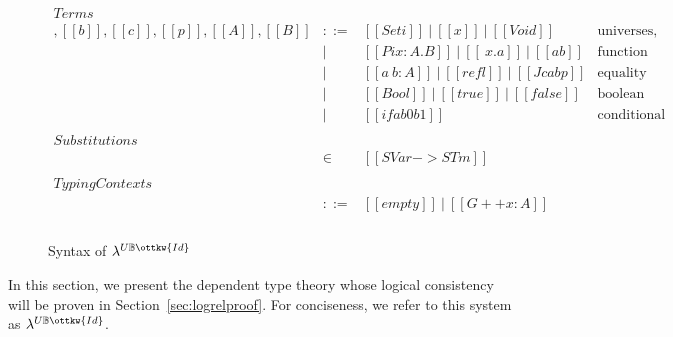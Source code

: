 \documentclass[acmsmall,screen=true,
\ifpublic review=false\else,review=true\fi
  ,anonymous=\ifanonymous true\else false\fi]{acmart}
\newcommand{\lang}{$\lambda^{U\mathbb{B}\ottkw{Id}}$\xspace}
\begin{document}
\begin{figure}[h]
\[
\begin{array}{lcll}
\mathit{Terms}\\
[[a]],[[b]],[[c]],[[p]],[[A]],[[B]] & ::= & [[Set i]]\ |\ [[x]]\  |\ [[Void]]
                  & \mbox{universes, variables, empty type} \\
            & |   & [[Pi x : A . B]]\ |\ [[\ x . a]]\ |\ [[a b]]
                  & \mbox{function types, abstractions, applications} \\
            & |   & [[a ~ b : A ]]\ |\  [[refl]]\ |\ [[J c a b p]]
                  & \mbox{equality types, reflexivity proof, J eliminator} \\
            & |   & [[Bool]]\ |\  [[true]]\ |\  [[false]]\ %
                  & \mbox{boolean type, true, false} \\
            & |   & [[if a b0 b1]]
                  & \mbox{conditional expression} \\ \\
\mathit{Substitutions}\\
[[rho]] & \in & [[SVar -> STm]] & \\ \\
\mathit{Typing Contexts}\\
 [[G]]       & ::= & [[empty]]\ |\ [[G ++ x : A]] &  \\ \\
\end{array}
\]
  \caption{Syntax of \lang}
  \label{fig:syntax}
\end{figure}


In this section, we present the dependent type theory whose logical
consistency will be proven in Section~\ref{sec:logrelproof}. For conciseness,
we refer to this system as \lang.
\end{document}
